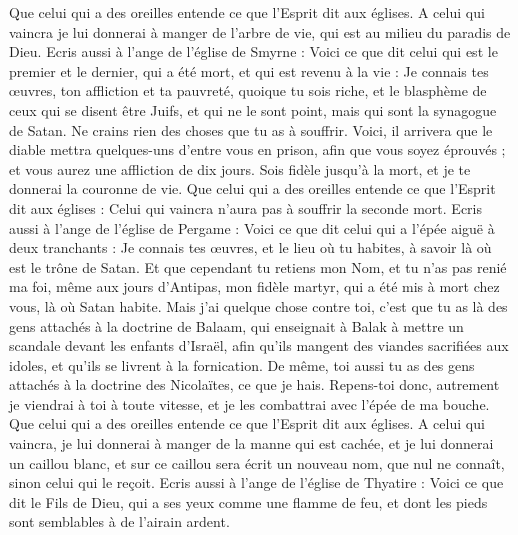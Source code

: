 \begin{multicols}{2}
Que celui qui a des oreilles entende ce que l'Esprit dit aux églises. A celui qui vaincra je lui donnerai à manger de l'arbre de vie, qui est au milieu du paradis de Dieu.
Ecris aussi à l'ange de l'église de Smyrne : Voici ce que dit celui qui est le premier et le dernier, qui a été mort, et qui est revenu à la vie :
Je connais tes œuvres, ton affliction et ta pauvreté, quoique tu sois riche, et le blasphème de ceux qui se disent être Juifs, et qui ne le sont point, mais qui sont la synagogue de Satan.
Ne crains rien des choses que tu as à souffrir. Voici, il arrivera que le diable mettra quelques-uns d'entre vous en prison, afin que vous soyez éprouvés ; et vous aurez une affliction de dix jours. Sois fidèle jusqu'à la mort, et je te donnerai la couronne de vie.
Que celui qui a des oreilles entende ce que l'Esprit dit aux églises : Celui qui vaincra n'aura pas à souffrir la seconde mort.
Ecris aussi à l'ange de l'église de Pergame : Voici ce que dit celui qui a l'épée aiguë à deux tranchants : 
Je connais tes œuvres, et le lieu où tu habites, à savoir là où est le trône de Satan. Et que cependant tu retiens mon Nom, et tu n'as pas renié ma foi, même aux jours d'Antipas, mon fidèle martyr, qui a été mis à mort chez vous, là où Satan habite.
Mais j'ai quelque chose contre toi, c'est que tu as là des gens attachés à la doctrine de Balaam, qui enseignait à Balak à mettre un scandale devant les enfants d'Israël, afin qu'ils mangent des viandes sacrifiées aux idoles, et qu'ils se livrent à la fornication.
De même, toi aussi tu as des gens attachés à la doctrine des Nicolaïtes, ce que je hais.
Repens-toi donc, autrement je viendrai à toi à toute vitesse, et je les combattrai avec l'épée de ma bouche.
Que celui qui a des oreilles entende ce que l'Esprit dit aux églises. A celui qui vaincra, je lui donnerai à manger de la manne qui est cachée, et je lui donnerai un caillou blanc, et sur ce caillou sera écrit un nouveau nom, que nul ne connaît, sinon celui qui le reçoit.
Ecris aussi à l'ange de l'église de Thyatire : Voici ce que dit le Fils de Dieu, qui a ses yeux comme une flamme de feu, et dont les pieds sont semblables à de l'airain ardent.

\end{multicols}
